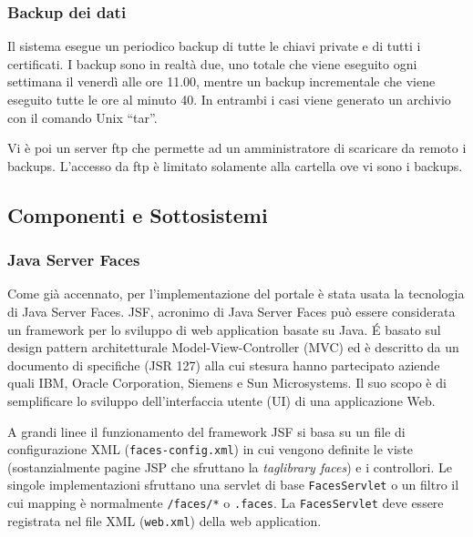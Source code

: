 \documentclass{article}
\begin{document}
\subsubsection*{Backup dei dati}
Il sistema esegue un periodico backup di tutte le chiavi private e di tutti i certificati. I backup sono in realtà due, uno totale che viene eseguito ogni settimana il venerdì alle ore 11.00, mentre un backup incrementale che viene eseguito tutte le ore al minuto 40. In entrambi i casi viene generato un archivio con il comando Unix ``tar''.
\par Vi è poi un server ftp che permette ad un amministratore di scaricare da remoto i backups. L'accesso da ftp è limitato solamente alla cartella ove vi sono i backups.
\subsection{Componenti e Sottosistemi}
\subsubsection*{Java Server Faces}
Come già accennato, per l'implementazione del portale è stata usata la tecnologia di Java Server Faces. JSF, acronimo di Java Server Faces può essere considerata un framework per lo sviluppo di web application basate su Java. \'E basato sul design pattern architetturale Model-View-Controller (MVC) ed è descritto da un documento di specifiche (JSR 127) alla cui stesura hanno partecipato aziende quali IBM, Oracle Corporation, Siemens e Sun Microsystems. Il suo scopo è di semplificare lo sviluppo dell'interfaccia utente (UI) di una applicazione Web.
\par A grandi linee il funzionamento del framework JSF si basa su un file di configurazione XML ({\tt faces-config.xml}) in cui vengono definite le viste (sostanzialmente pagine JSP che sfruttano la \emph{taglibrary faces}) e i controllori. Le singole implementazioni sfruttano una servlet di base {\tt FacesServlet} o un filtro il cui mapping è normalmente {\tt /faces/*} o {\tt *.faces}. La {\tt FacesServlet} deve essere registrata nel file XML ({\tt web.xml}) della web application.
\end{document}

